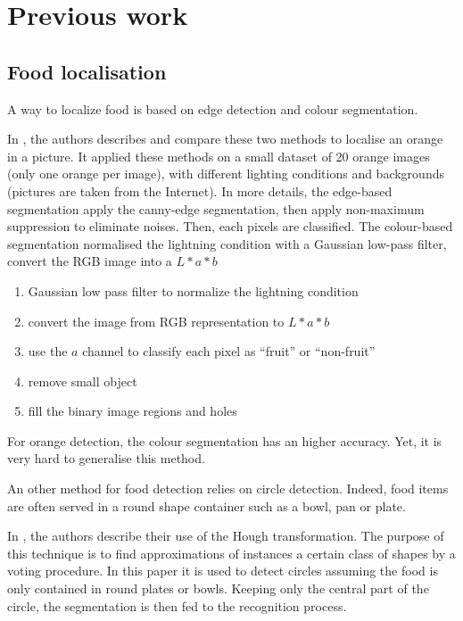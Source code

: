 \chapter{Previous work} \label{sec:previous_work}
\section{Food localisation}


A way to localize food is based on edge detection and colour segmentation.

In \cite{Thendral2014a}, the authors describes and compare these two methods to localise an orange in a picture. It applied these methods on a small dataset of 20 orange images (only one orange per image), with different lighting conditions and backgrounds (pictures are taken from the Internet).
In more details, the edge-based segmentation apply the canny-edge segmentation, then apply non-maximum suppression to eliminate noises. Then, each pixels are classified.
The colour-based segmentation normalised the lightning condition with a Gaussian low-pass filter, convert the RGB image into a $L * a * b$
\begin{enumerate}
    \item Gaussian low pass filter to normalize the lightning condition
    \item convert the image from RGB representation to $L * a * b$
    \item use the $a$ channel to classify each pixel as \enquote{fruit} or \enquote{non-fruit}
    \item remove small object
    \item fill the binary image regions and holes
\end{enumerate}
For orange detection, the colour segmentation has an higher accuracy. Yet, it is very hard to generalise this method.


An other method for food detection relies on circle detection. Indeed, food items are often served in a round shape container such as a bowl, pan or plate.

In \cite{Wazumi2011}, the authors describe their use of the Hough transformation. The purpose of this technique is to find approximations of instances a certain class of shapes by a voting procedure.
In this paper it is used to detect circles assuming the food is only contained in round plates or bowls. Keeping only the central part of the circle, the segmentation is then fed to the recognition process.

